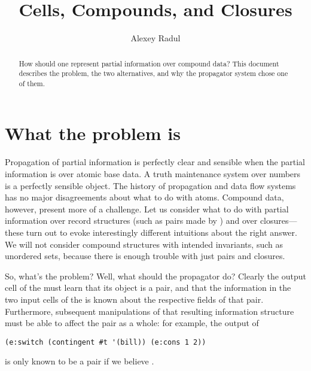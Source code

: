 \documentclass[12pt,letterpaper]{article}
\author{Alexey Radul}
\title{Cells, Compounds, and Closures}
\begin{document}
\maketitle

\begin{abstract}
How should one represent partial information over compound data?
This document describes the problem, the two alternatives, and why
the propagator system chose one of them.
\end{abstract}

\section{What the problem is}

Propagation of partial information is perfectly clear and sensible
when the partial information is over atomic base data.  A truth
maintenance system over numbers is a perfectly sensible object.  The
history of propagation and data flow systems has no major
disagreements about what to do with atoms.  Compound data, however,
present more of a challenge.  Let us consider what to do with partial
information over record structures (such as pairs made by )
and over closures---these turn out to evoke interestingly different
intuitions about the right answer.  We will not consider compound
structures with intended invariants, such as unordered sets, because
there is enough trouble with just pairs and closures.

So, what's the problem?  Well, what should the  propagator
do?  Clearly the output cell of the  must learn that its
object is a pair, and that the information in the two input cells of
the  is known about the respective fields of that pair.
Furthermore, subsequent manipulations of that resulting information
structure must be able to affect the pair as a whole: for example, the
output of
\begin{verbatim}
(e:switch (contingent #t '(bill)) (e:cons 1 2))
\end{verbatim}
is only known to be a pair if we believe .
\end{document}
